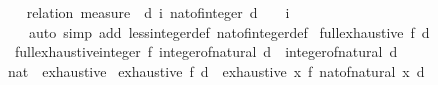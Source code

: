 \begin{isabellebody}
\isanewline
%
\endisadelimproof
\isanewline
{}\isamarkupfalse%
\isanewline
%
\isadelimproof
\ \ %
\endisadelimproof
%
\isatagproof
{}\isamarkupfalse%
\ {\isacharparenleft}{\kern0pt}relation\ {\isachardoublequoteopen}measure\ {\isacharparenleft}{\kern0pt}{\isasymlambda}{\isacharparenleft}{\kern0pt}{\isacharunderscore}{\kern0pt}{\isacharcomma}{\kern0pt}\ d{\isacharcomma}{\kern0pt}\ i{\isacharparenright}{\kern0pt}{\isachardot}{\kern0pt}\ nat{\isacharunderscore}{\kern0pt}of{\isacharunderscore}{\kern0pt}integer\ {\isacharparenleft}{\kern0pt}d\ {\isacharplus}{\kern0pt}\ {}\ {\isacharminus}{\kern0pt}\ i{\isacharparenright}{\kern0pt}{\isacharparenright}{\kern0pt}{\isachardoublequoteclose}{\isacharparenright}{\kern0pt}\isanewline
\ \ \ \ {\isacharparenleft}{\kern0pt}auto\ simp\ add{\isacharcolon}{\kern0pt}\ less{\isacharunderscore}{\kern0pt}integer{\isacharunderscore}{\kern0pt}def\ nat{\isacharunderscore}{\kern0pt}of{\isacharunderscore}{\kern0pt}integer{\isacharunderscore}{\kern0pt}def{\isacharparenright}{\kern0pt}%
\endisatagproof
{\isafoldproof}%
%
\isadelimproof
\isanewline
%
\endisadelimproof
\isanewline
{}\isamarkupfalse%
\ {\isachardoublequoteopen}full{\isacharunderscore}{\kern0pt}exhaustive\ f\ d\ {\isacharequal}{\kern0pt}\isanewline
\ \ full{\isacharunderscore}{\kern0pt}exhaustive{\isacharunderscore}{\kern0pt}integer{\isacharprime}{\kern0pt}\ f\ {\isacharparenleft}{\kern0pt}integer{\isacharunderscore}{\kern0pt}of{\isacharunderscore}{\kern0pt}natural\ d{\isacharparenright}{\kern0pt}\ {\isacharparenleft}{\kern0pt}{\isacharminus}{\kern0pt}\ {\isacharparenleft}{\kern0pt}integer{\isacharunderscore}{\kern0pt}of{\isacharunderscore}{\kern0pt}natural\ d{\isacharparenright}{\kern0pt}{\isacharparenright}{\kern0pt}{\isachardoublequoteclose}\isanewline
\isanewline
{}\isamarkupfalse%
%
\isadelimproof
\ %
\endisadelimproof
%
\isatagproof
\isacommand{{\isachardot}{\kern0pt}{\isachardot}{\kern0pt}}\isamarkupfalse%
%
\endisatagproof
{\isafoldproof}%
%
\isadelimproof
%
\endisadelimproof
\isanewline
\isanewline
{}\isamarkupfalse%
\isanewline
\isanewline
{}\isamarkupfalse%
\ nat\ {\isacharcolon}{\kern0pt}{\isacharcolon}{\kern0pt}\ exhaustive\isanewline
{}\isanewline
\isanewline
{}\isamarkupfalse%
\ {\isachardoublequoteopen}exhaustive\ f\ d\ {\isacharequal}{\kern0pt}\ exhaustive\ {\isacharparenleft}{\kern0pt}{\isasymlambda}x{\isachardot}{\kern0pt}\ f\ {\isacharparenleft}{\kern0pt}nat{\isacharunderscore}{\kern0pt}of{\isacharunderscore}{\kern0pt}natural\ x{\isacharparenright}{\kern0pt}{\isacharparenright}{\kern0pt}\ d{\isachardoublequoteclose}\isanewline

\end{isabellebody}

